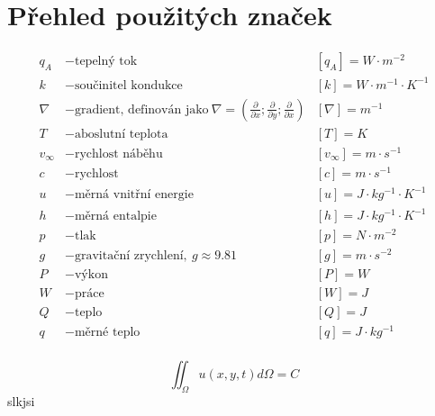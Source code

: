 \documentclass[12pt,a4paper, fleqn, twoside]{report}
\begin{document}
\section*{Přehled použitých značek}
\begin{align*}
q_A & - \text{tepelný tok } & [q_A] = W\cdot m^{-2}\\
k & - \text{součinitel kondukce} & [k] = W\cdot m^{-1}\cdot K^{-1}\\
\nabla & - \text{gradient, definován jako}\ \nabla = \displaystyle\left(\frac{\partial}{\partial x};\frac{\partial}{\partial y};\frac{\partial}{\partial x}\right) & [\nabla] = m^{-1}\\
T & - \text{aboslutní teplota} & [T] = K\\
v_{\infty} & - \text{rychlost náběhu} & [v_{\infty}] = m\cdot s^{-1}\\
c & - \text{rychlost} & [c] = m\cdot s^{-1}\\
u & - \text{měrná vnitřní energie} & [u] = J\cdot kg^{-1} \cdot K^{-1}\\
h & - \text{měrná entalpie} & [h] = J\cdot kg^{-1} \cdot K^{-1}\\
p & - \text{tlak} & [p] = N\cdot m^{-2}\\
g & - \text{gravitační zrychlení},\ g \approx 9.81 & [g] = m \cdot s^{-2}\\
P & - \text{výkon} & [P] = W\\ 
W & - \text{práce} & [W] = J\\
Q & - \text{teplo} & [Q] = J\\
q & - \text{měrné teplo} & [q] = J \cdot kg^{-1}\\
\end{align*}

\pagebreak




\[
\iint_{\Omega}u(x,y,t)d\Omega = C
\]
slkjsi \cite{benoit2006dynamic}


\appendix




\end{document}
